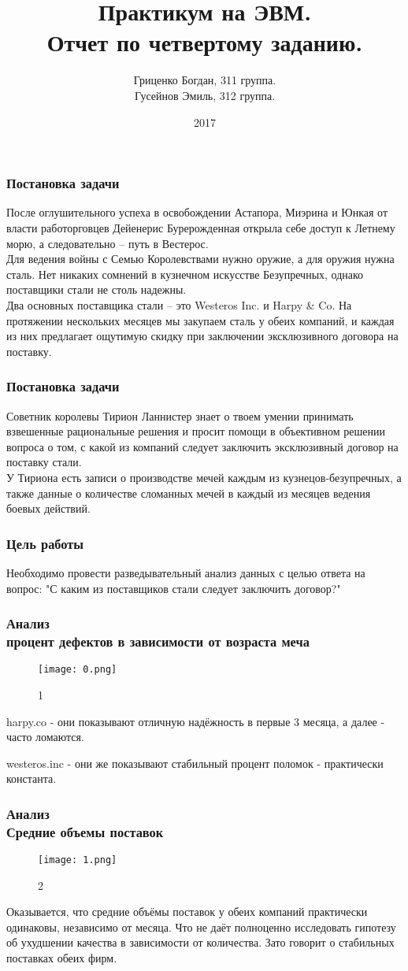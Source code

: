 \documentclass[8pt]{beamer}
\title{Практикум на ЭВМ.\\ Отчет по четвертому заданию.}
\author{Гриценко Богдан, 311 группа.\\ Гусейнов Эмиль, 312 группа.}
\institute{МГУ имени М.В. Ломоносова, Москва, Россия}
\date{2017}
\begin{document}
 
\frame{\titlepage}
 
\begin{frame}
\frametitle{Постановка задачи}
После оглушительного успеха в освобождении Астапора, Миэрина и Юнкая от власти работорговцев Дейенерис Бурерожденная открыла себе доступ к Летнему морю, а следовательно -- путь в Вестерос.\\
Для ведения войны с Семью Королевствами нужно оружие, а для оружия нужна сталь. Нет никаких сомнений в кузнечном искусстве Безупречных, однако поставщики стали не столь надежны.\\
Два основных поставщика стали -- это {Westeros Inc.} и {Harpy \& Co}. На протяжении нескольких месяцев мы закупаем сталь у обеих компаний, и каждая из них предлагает ощутимую скидку при заключении эксклюзивного договора на поставку.\\
\end{frame}

\begin{frame}
\frametitle{Постановка задачи}
Советник королевы Тирион Ланнистер знает о твоем умении принимать взвешенные рациональные решения и просит помощи в объективном решении вопроса о том, с какой из компаний следует заключить эксклюзивный договор на поставку стали.\\
У Тириона есть записи о производстве мечей каждым из кузнецов-безупречных, а также данные о количестве сломанных мечей в каждый из месяцев ведения боевых действий.\\
\end{frame}
 
\begin{frame}
\frametitle{Цель работы}
Необходимо провести разведывательный анализ данных с целью ответа на вопрос: "С каким из поставщиков стали следует заключить договор?"
\end{frame}

\begin{frame}
\frametitle{Анализ\\{ процент дефектов в зависимости от возраста меча}}
\begin{figure}[h]
		\texttt{[image: 0.png]}
		\caption{1}
		\label{First}
\end{figure}
harpy.co - они показывают отличную надёжность в первые 3 месяца, а далее - часто ломаются.

westeros.inc - они же показывают стабильный процент поломок - практически константа.
\end{frame}

\begin{frame}
\frametitle{Анализ \\{\small Средние объемы поставок}}
\begin{figure}[h]
		\texttt{[image: 1.png]}
		\caption{2}
		\label{Second}
\end{figure}

Оказывается, что средние объёмы поставок у обеих компаний практически одинаковы, независимо от месяца. Что не даёт полноценно исследовать гипотезу об ухудшении качества в зависимости от количества. Зато говорит о стабильных поставках обеих фирм.
\end{frame}
\end{document}
